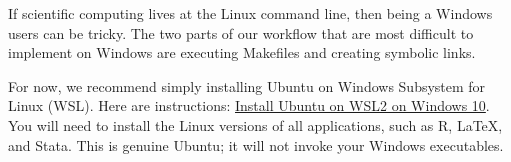 If scientific computing lives at the Linux command line,
then being a Windows users can be tricky.
The two parts of our workflow that are most difficult to implement on Windows
are executing Makefiles and creating symbolic links.

For now, we recommend simply installing Ubuntu on Windows Subsystem for Linux (WSL).
Here are instructions:
\href{https://ubuntu.com/tutorials/install-ubuntu-on-wsl2-on-windows-10}{Install Ubuntu on WSL2 on Windows 10}.
You will need to install the Linux versions of all applications, such as R, LaTeX, and Stata.
This is genuine Ubuntu; it will not invoke your Windows executables.
